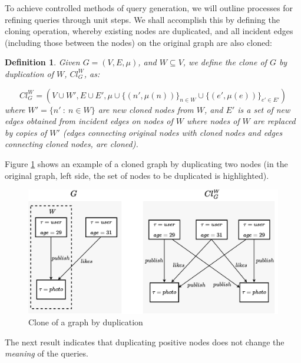 \documentclass[mathematics,article,submit,pdftex,moreauthors]{Definitions/mdpi}
\newtheorem{definition}{Definition}[section]
\begin{document}
To achieve controlled methods of query generation, we will outline processes for refining queries through unit steps. We shall accomplish this by defining the cloning operation, whereby existing nodes are duplicated, and all incident edges (including those between the nodes) on the original graph are also cloned: 

\begin{definition}{}
    Given $G=(V,E,\mu)$, and $W\subseteq V$, we define the \emph{clone of $G$ by duplication of $W$}, $Cl_G^W$, as:
    
    $$Cl_G^W=(V\cup W',E\cup E',\mu\cup \{(n',\mu(n))\}_{n\in W}\cup \{(e',\mu(e))\}_{e'\in E'})$$
    where $W'=\{n'\ :\ n\in W\}$ are new cloned nodes from $W$, and $ E '$ is a set of new edges obtained from incident edges on nodes of $ W $ where nodes of $ W $ are replaced by copies of $ W' $ (edges connecting original nodes with cloned nodes and edges connecting cloned nodes, are cloned).
\end{definition}\medskip

Figure \ref{ejemplo-clonacion} shows an example of a cloned graph by duplicating two nodes (in the original graph, left side, the set of nodes to be duplicated is highlighted).
\begin{figure}[h]
    \begin{center}
        \includegraphics[width=\columnwidth]{png/FIG3.pdf}
    \end{center}
    \caption{%
        Clone of a graph by duplication
    }%
    \label{ejemplo-clonacion}
\end{figure}

The next result indicates that duplicating positive nodes does not change the \textit{meaning} of the queries.
\end{document}
